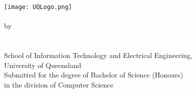 \begin{titlepage}
	\begin{center}
		\texttt{[image: UQLogo.png]}\\
        \vfill
		\huge\textbf{\covertext}\\
        \vfill
		\large by\\
		\vspace{5mm}
		\Large\textbf{\authortext}\\
        \large \studentnotext \\
        \large {}
        \vfill
		\large School of Information Technology and Electrical Engineering,\\\smallskip
        \large University of Queensland\\
        \vfill
		\large Submitted for the degree of Bachelor of Science (Honours)\\\smallskip
        \large in the division of Computer Science
        \vfill
		\large \thesisduedate
	\end{center}
\end{titlepage}